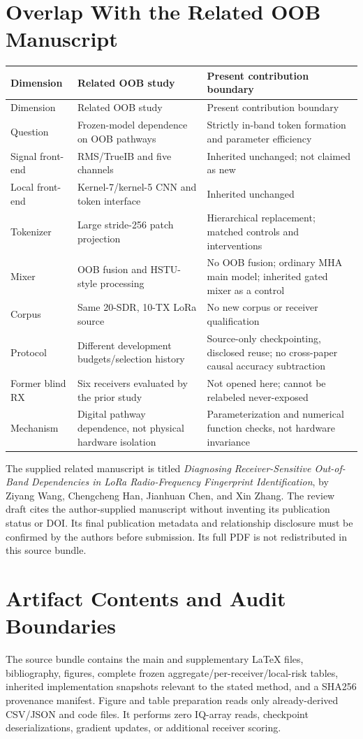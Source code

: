 \documentclass[11pt]{article}
\begin{document}
\section{Overlap With the Related OOB Manuscript}
\begin{longtable}{p{2.5cm}p{5.6cm}p{6.7cm}}
\toprule Dimension & Related OOB study & Present contribution boundary\\\midrule\endfirsthead
\toprule Dimension & Related OOB study & Present contribution boundary\\\midrule\endhead
Question & Frozen-model dependence on OOB pathways & Strictly in-band token formation and parameter efficiency\\
Signal front-end & RMS/TrueIB and five channels & Inherited unchanged; not claimed as new\\
Local front-end & Kernel-7/kernel-5 CNN and token interface & Inherited unchanged\\
Tokenizer & Large stride-256 patch projection & Hierarchical replacement; matched controls and interventions\\
Mixer & OOB fusion and HSTU-style processing & No OOB fusion; ordinary MHA main model; inherited gated mixer as a control\\
Corpus & Same 20-SDR, 10-TX LoRa source & No new corpus or receiver qualification\\
Protocol & Different development budgets/selection history & Source-only checkpointing, disclosed reuse; no cross-paper causal accuracy subtraction\\
Former blind RX & Six receivers evaluated by the prior study & Not opened here; cannot be relabeled never-exposed\\
Mechanism & Digital pathway dependence, not physical hardware isolation & Parameterization and numerical function checks, not hardware invariance\\\bottomrule
\end{longtable}

The supplied related manuscript is titled \emph{Diagnosing Receiver-Sensitive Out-of-Band Dependencies in LoRa Radio-Frequency Fingerprint Identification}, by Ziyang Wang, Chengcheng Han, Jianhuan Chen, and Xin Zhang. The review draft cites the author-supplied manuscript without inventing its publication status or DOI. Its final publication metadata and relationship disclosure must be confirmed by the authors before submission. Its full PDF is not redistributed in this source bundle.

\section{Artifact Contents and Audit Boundaries}
The source bundle contains the main and supplementary LaTeX files, bibliography, figures, complete frozen aggregate/per-receiver/local-risk tables, inherited implementation snapshots relevant to the stated method, and a SHA256 provenance manifest. Figure and table preparation reads only already-derived CSV/JSON and code files. It performs zero IQ-array reads, checkpoint deserializations, gradient updates, or additional receiver scoring.
\end{document}
